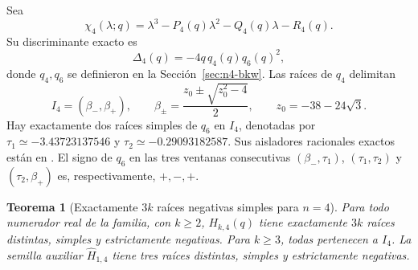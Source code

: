 \documentclass[11pt,a4paper]{article}
\newtheorem{theorem}{Teorema}[section]
\theoremstyle{definition}
\begin{document}
Sea
\[
\chi_4(\lambda;q)=\lambda^3-P_4(q)\lambda^2-Q_4(q)\lambda-R_4(q).
\]
Su discriminante exacto es
\[
\Delta_4(q)=-4q\,q_4(q)q_6(q)^2,
\]
donde $q_4,q_6$ se definieron en la Sección~\ref{sec:n4-bkw}. Las
raíces de $q_4$ delimitan
\[
I_4=(\beta_-,\beta_+),\qquad
\beta_\pm=\frac{z_0\pm\sqrt{z_0^2-4}}2,\qquad
z_0=-38-24\sqrt3.
\]
Hay exactamente dos raíces simples de $q_6$ en $I_4$, denotadas por
$\tau_1\simeq-3.43723137546$ y
$\tau_2\simeq-0.29093182587$. Sus aisladores racionales exactos están
en . El signo
de $q_6$ en las tres ventanas consecutivas
$(\beta_-,\tau_1)$, $(\tau_1,\tau_2)$ y $(\tau_2,\beta_+)$ es,
respectivamente, $+,-,+$.

\begin{theorem}[Exactamente $3k$ raíces negativas simples para $n=4$]
\label{thm:n4-realrooted}
Para todo numerador real de la familia, con $k\ge2$,
$H_{k,4}(q)$ tiene exactamente $3k$ raíces distintas, simples y
estrictamente negativas. Para $k\ge3$, todas pertenecen a $I_4$. La
semilla auxiliar $\widehat H_{1,4}$ tiene tres raíces distintas,
simples y estrictamente negativas.
\end{theorem}
\end{document}
